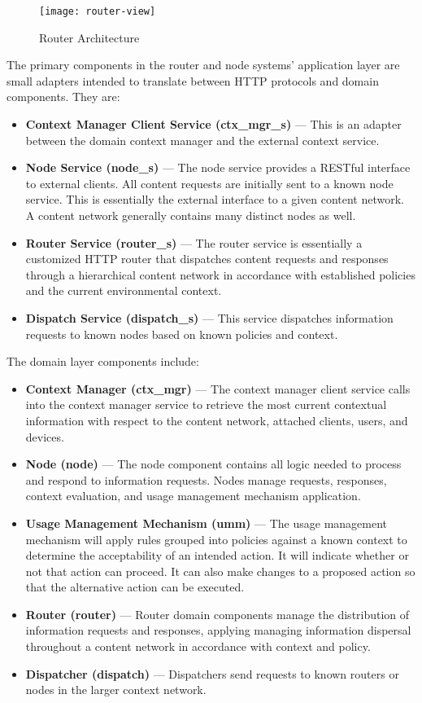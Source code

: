 \begin{figure}[!t]
\centering
\texttt{[image: router-view]}
\caption{Router Architecture}
\label{fig:model:router-view}
\end{figure}

The primary components in the router and node systems' application layer are small adapters intended to translate between HTTP protocols and domain components.  They are:

\begin{itemize}
\item \textbf{Context Manager Client Service (ctx\_mgr\_s)} --- This is an adapter between the domain context manager and the external context service.
\item \textbf{Node Service (node\_s)} --- The node service provides a RESTful interface to external clients.  All content requests are initially sent to a known node service.  This is essentially the external interface to a given content network.  A content network generally contains many distinct nodes as well.
\item \textbf{Router Service (router\_s)} --- The router service is essentially a customized HTTP router that dispatches content requests and responses through a hierarchical content network in accordance with established policies and the current environmental context.
\item \textbf{Dispatch Service (dispatch\_s)} --- This service dispatches information requests to known nodes based on known policies and context.
\end{itemize}

The domain layer components include:

\begin{itemize}
\item \textbf{Context Manager (ctx\_mgr)} --- The context manager client service calls into the context manager service to retrieve the most current contextual information with respect to the content network, attached clients, users, and devices.
\item \textbf{Node (node)} --- The node component contains all logic needed to process and respond to information requests.  Nodes manage requests, responses, context evaluation, and usage management mechanism application.
\item \textbf{Usage Management Mechanism (umm)} --- The usage management mechanism will apply rules grouped into policies against a known context to determine the acceptability of an intended action.  It will indicate whether or not that action can proceed.  It can also make changes to a proposed action so that the alternative action can be executed.
\item \textbf{Router (router)} --- Router domain components manage the distribution of information requests and responses, applying managing information dispersal throughout a content network in accordance with context and policy.
\item \textbf{Dispatcher (dispatch)} --- Dispatchers send requests to known routers or nodes in the larger context network.
\end{itemize}

